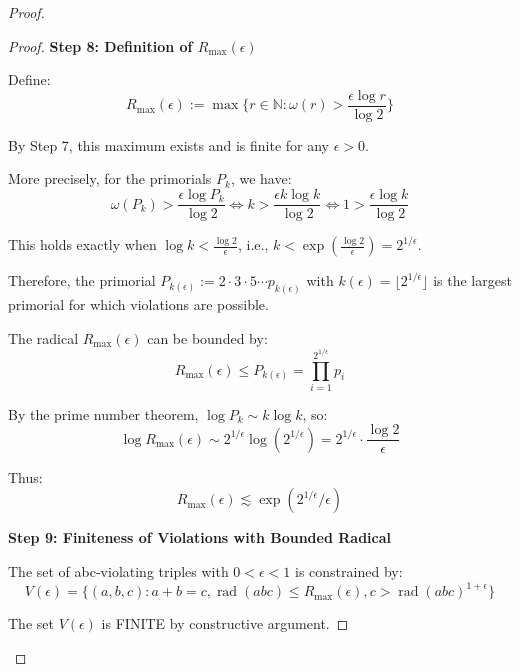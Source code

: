 \begin{proof}
\begin{proof}
\noindent \textbf{Step 8: Definition of $R_{\max}(\epsilon)$}

Define:
\begin{equation}
R_{\max}(\epsilon) := \max\{r \in \mathbb{N} : \omega(r) > \frac{\epsilon \log r}{\log 2}\}
\end{equation}

By Step 7, this maximum exists and is finite for any $\epsilon > 0$.

More precisely, for the primorials $P_k$, we have:
\begin{equation}
\omega(P_k) > \frac{\epsilon \log P_k}{\log 2} \iff k > \frac{\epsilon k \log k}{\log 2} \iff 1 > \frac{\epsilon \log k}{\log 2}
\end{equation}

This holds exactly when $\log k < \frac{\log 2}{\epsilon}$, i.e., $k < \exp\left(\frac{\log 2}{\epsilon}\right) = 2^{1/\epsilon}$.

Therefore, the primorial $P_{k(\epsilon)} := 2 \cdot 3 \cdot 5 \cdots p_{k(\epsilon)}$ with $k(\epsilon) = \lfloor 2^{1/\epsilon} \rfloor$ is the largest primorial for which violations are possible.

The radical $R_{\max}(\epsilon)$ can be bounded by:
\begin{equation}
R_{\max}(\epsilon) \leq P_{k(\epsilon)} = \prod_{i=1}^{2^{1/\epsilon}} p_i
\end{equation}

By the prime number theorem, $\log P_k \sim k \log k$, so:
\begin{equation}
\log R_{\max}(\epsilon) \sim 2^{1/\epsilon} \log(2^{1/\epsilon}) = 2^{1/\epsilon} \cdot \frac{\log 2}{\epsilon}
\end{equation}

Thus:
\begin{equation}
R_{\max}(\epsilon) \lesssim \exp\left(2^{1/\epsilon} / \epsilon\right)
\end{equation}

\noindent \textbf{Step 9: Finiteness of Violations with Bounded Radical}

The set of abc-violating triples with $0 < \epsilon < 1$ is constrained by:
\begin{equation}
V(\epsilon) = \{(a,b,c) : a+b=c, \operatorname{rad}(abc) \leq R_{\max}(\epsilon), c > \operatorname{rad}(abc)^{1+\epsilon}\}
\end{equation}

The set $V(\epsilon)$ is FINITE by constructive argument.


\end{proof}
\end{proof}

